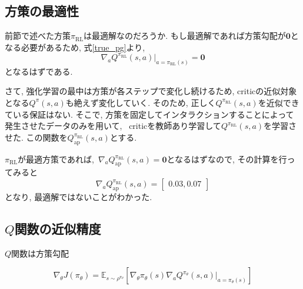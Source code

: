 \documentclass[dvipdfmx]{ampmt}
\newcommand{\expect}{\mathbb{E}}
\begin{document}
\subsection{方策の最適性}
前節で述べた方策$\pi_{\textrm{RL}}$は最適解なのだろうか. もし最適解であれば方策勾配が$\bm{0}$となる必要があるため, 式\eqref{true_pg}より,
\begin{equation}
	\nabla_a Q^{\pi_{\textrm{RL}}}(s,a)|_{a=\pi_{\textrm{RL}}(s)} = \bm{0}
\end{equation}
となるはずである. \par
さて, 強化学習の最中は方策が各ステップで変化し続けるため, criticの近似対象となる$Q^{\pi}(s,a)$も絶えず変化していく. そのため, 正しく$Q^{\pi_{\textrm{RL}}}(s,a)$を近似できている保証はない. そこで, 方策を固定してインタラクションすることによって発生させたデータのみを用いて, ~criticを教師あり学習して$Q^{\pi_{\textrm{RL}}}(s,a)$を学習させた. この関数を$Q_{\textrm{ap}}^{\pi_{\textrm{RL}}}(s,a)$とする.\par
$\pi_{\textrm{RL}}$が最適方策であれば,~$\nabla_aQ_{\textrm{ap}}^{\pi_{\textrm{RL}}}(s,a) = \bm{0}$となるはずなので, その計算を行ってみると
\[\nabla_aQ_{\textrm{ap}}^{\pi_{\textrm{RL}}}(s,a) = \begin{bmatrix}0.03, 0.07\end{bmatrix}\]
となり, 最適解ではないことがわかった.
\par

\subsection{$Q$関数の近似精度}
$Q$関数は方策勾配

\[\nabla_{\theta}J(\pi_{\theta}) = \expect_{s\sim\rho^{\pi_{\theta}}}[
	\nabla_{\theta}\pi_{\theta}(s)\nabla_{a}Q^{\pi_{\theta}}(s, a)|_{a=\pi_{\theta}(s)}] \]
\end{document}
